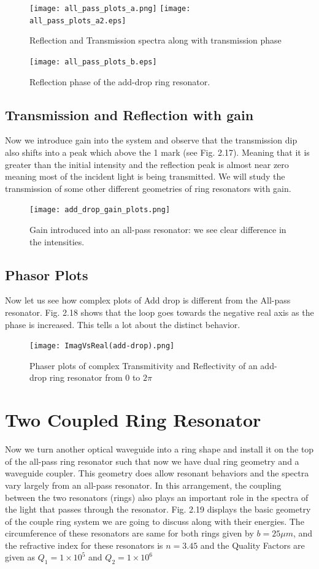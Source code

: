 \begin{figure}[h]
\centering
\texttt{[image: all\_pass\_plots\_a.png]}
\texttt{[image: all\_pass\_plots\_a2.eps]}
\caption{Reflection and Transmission spectra along with transmission phase} 
\end{figure}
\newpage
\begin{figure}[t]
\centering
\texttt{[image: all\_pass\_plots\_b.eps]}
\caption{Reflection phase of the add-drop ring resonator.}
\end{figure}

\subsection{Transmission and Reflection with gain}
Now we introduce gain into the system and observe that the transmission dip also shifts into a peak which above the 1 mark (see Fig. 2.17). Meaning that it is greater than the initial intensity and the reflection peak is almost near zero meaning most of the incident light is being transmitted. We will study the transmission of some other different geometries of ring resonators with gain. 


\begin{figure}[h]
\centering
\texttt{[image: add\_drop\_gain\_plots.png]}
\caption{Gain introduced into an all-pass resonator: we see clear difference in the intensities.}
\end{figure}

\subsection{Phasor Plots}
Now let us see how complex plots of Add drop is different from the All-pass resonator. Fig. 2.18 shows that the loop goes towards the negative real axis as the phase is increased. This tells a lot about the distinct behavior.

\begin{figure}[h]
\centering
\texttt{[image: ImagVsReal(add-drop).png]}
\caption{Phaser plots of complex Transmitivity and Reflectivity of an add-drop ring resonator from 0 to $2\pi$}
\end{figure}


\section{Two Coupled Ring Resonator}
Now we turn another optical waveguide into a ring shape and install it on the top of the all-pass ring resonator such that now we have dual ring geometry and a waveguide coupler. This geometry does allow resonant behaviors and the spectra vary largely from an all-pass resonator.
In this arrangement, the coupling between the two resonators (rings) also plays an important role in the spectra of the light that passes through the resonator. Fig. 2.19 displays the basic geometry of the couple ring system we are going to discuss along with their energies. The circumference of these resonators are same for both rings given by $b = 25\mu m$, and the refractive index for these resonators is $n=3.45$ and the Quality Factors are given as $Q_{1} = 1\times10^{5}$ and $Q_{2} = 1\times10^{6}$

